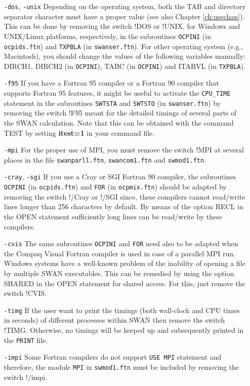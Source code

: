 \documentclass[12pt]{book}
\begin{document}
\begin{itemize}
  \item[{\tt -dos}, {\tt -unix}]
  Depending on the operating system, both the TAB and directory separator character must
  have a proper value (see also Chapter \ref{ch:usechan}). This can be done by removing
  the switch !DOS or !UNIX, for Windows and UNIX/Linux platforms, respectively, in the
  subroutines {\tt OCPINI} (in {\tt ocpids.ftn}) and {\tt TXPBLA} (in {\tt swanser.ftn}).
  For other operating system (e.g., Macintosh), you should change the values of the following
  variables manually: {\scriptsize DIRCH1}, {\scriptsize DIRCH2} (in {\tt OCPINI}),
  {\scriptsize TABC} (in {\tt OCPINI}) and {\scriptsize ITABVL} (in {\tt TXPBLA}).
  \item[{\tt -f95}]
  If you have a Fortran 95 compiler or a Fortran 90 compiler that supports Fortran 95
  features, it might be useful to activate the {\tt CPU\_TIME} statement in the subroutines
  {\tt SWTSTA} and {\tt SWTSTO} (in {\tt swanser.ftn}) by removing the switch !F95 meant for
  the detailed timings of several parts of the SWAN calculation. Note that this can be
  obtained with the command TEST by setting {\bf itest=1} in your command file.
  \item[{\tt -mpi}]
  For the proper use of MPI, you must remove the switch !MPI at several places in the file
  {\tt swanparll.ftn}, {\tt swancom1.ftn} and {\tt swmod1.ftn}.
  \item[{\tt -cray}, {\tt -sgi}]
  If you use a Cray or SGI Fortran 90 compiler, the subroutines {\tt OCPINI} (in {\tt ocpids.ftn})
  and {\tt FOR} (in {\tt ocpmix.ftn}) should be adapted by removing the switch !/Cray or !/SGI since,
  these compilers cannot read/write lines longer than 256 characters by default. By means
  of the option {\scriptsize RECL} in the OPEN statement sufficiently long lines can be
  read/write by these compilers.
  \item[{\tt -cvis}]
  The same subroutines {\tt OCPINI} and {\tt FOR} need also to be adapted when the Compaq Visual
  Fortran compiler is used in case of a parallel MPI run. Windows systems have a well-known problem
  of the inability of opening a file by multiple SWAN executables. This can be remedied by using the
  option {\scriptsize SHARED} in the OPEN statement for shared access. For this, just remove the
  switch !CVIS.
  \item[{\tt -timg}]
  If the user want to print the timings (both wall-clock and CPU times in seconds) of different
  processes within SWAN then remove the switch !TIMG. Otherwise, no timings will be keeped up
  and subsequently printed in the {\tt PRINT} file.
  \item[{\tt -impi}]
  Some Fortran compilers do not support {\tt USE MPI} statement and therefore,
  the module {\tt MPI} in {\tt swmod1.ftn} must be included by removing the switch !/impi.
\end{itemize}
\end{document}
